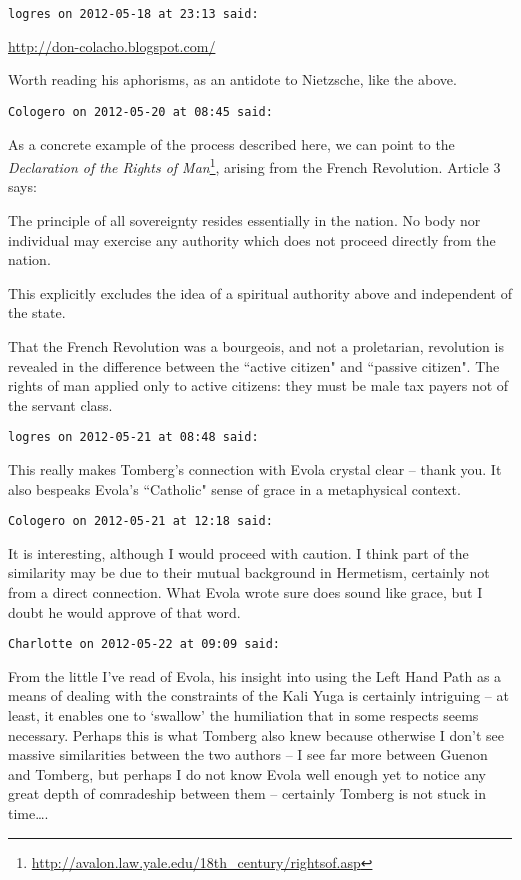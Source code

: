 \begin{footnotesize}
\begin{sffamily}


\hfill

\texttt{logres on 2012-05-18 at 23:13 said: }

\url{http://don-colacho.blogspot.com/}

Worth reading his aphorisms, as an antidote to Nietzsche, like the above.


\hfill

\texttt{Cologero on 2012-05-20 at 08:45 said: }

As a concrete example of the process described here, we can point to the \textit{Declaration of the Rights of Man}\footnote{\url{http://avalon.law.yale.edu/18th_century/rightsof.asp}}, arising from the French Revolution. Article 3 says:

\begin{quotex}
The principle of all sovereignty resides essentially in the nation. No body nor individual may exercise any authority which does not proceed directly from the nation.

\end{quotex}
This explicitly excludes the idea of a spiritual authority above and independent of the state.

That the French Revolution was a bourgeois, and not a proletarian, revolution is revealed in the difference between the ``active citizen" and ``passive citizen". The rights of man applied only to active citizens: they must be male tax payers not of the servant class.


\hfill

\texttt{logres on 2012-05-21 at 08:48 said: }

This really makes Tomberg's connection with Evola crystal clear – thank you. It also bespeaks Evola's ``Catholic" sense of grace in a metaphysical context.


\hfill

\texttt{Cologero on 2012-05-21 at 12:18 said: }

It is interesting, although I would proceed with caution. I think part of the similarity may be due to their mutual background in Hermetism, certainly not from a direct connection. What Evola wrote sure does sound like grace, but I doubt he would approve of that word.


\hfill

\texttt{Charlotte on 2012-05-22 at 09:09 said: }

From the little I've read of Evola, his insight into using the Left Hand Path as a means of dealing with the constraints of the Kali Yuga is certainly intriguing – at least, it enables one to `swallow' the humiliation that in some respects seems necessary. Perhaps this is what Tomberg also knew because otherwise I don't see massive similarities between the two authors – I see far more between Guenon and Tomberg, but perhaps I do not know Evola well enough yet to notice any great depth of comradeship between them – certainly Tomberg is not stuck in time….


\end{sffamily}
\end{footnotesize}
